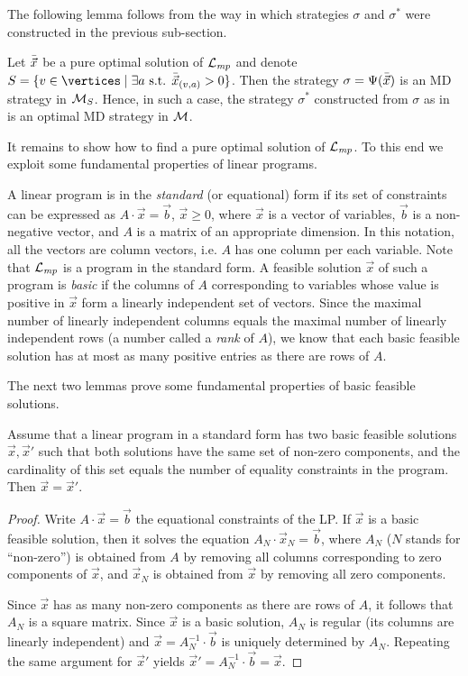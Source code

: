 \noindent
The following lemma follows from the way in which strategies $\sigma$ and $\sigma^*$ were constructed in the previous sub-section.

\begin{lemma}
	\label{5-lem:pure-lpsol}
Let $\bar{\vec{x}}$ be a pure optimal solution of $\mathcal{L}_{\mathit{mp}}$ and denote $ S = \{v \in \vertices\mid \exists a \text{ s.t. }\lpsol{x}_{(v,a)}>0\} $. Then the strategy $\sigma=\Psi(\bar{\vec{x}})$ is an MD strategy in $\mathcal{M}_{S}$. Hence, in such a case, the strategy $\sigma^*$ constructed from $ \sigma $ as in  is an optimal MD strategy in $\mathcal{M}$.
\end{lemma}

It remains to show how to find a pure optimal solution of $\mathcal{L}_{\mathit{mp}}$. To this end we exploit some fundamental properties of linear programs.

A linear program is in the \emph{standard} (or equational) form if its set of constraints can be expressed as $A\cdot \vec{x} = \vec{b}$, $\vec{x}\geq 0$, where $\vec{x}$ is a vector of variables, $\vec{b}$ is a non-negative vector, and $A$ is a matrix of an appropriate dimension. In this notation, all the vectors are column vectors, i.e. $A$ has one column per each variable. Note that $\mathcal{L}_{\mathit{mp}}$ is a program in the standard form. A feasible solution $\vec{x}$ of such a program is \emph{basic} if the columns of $A$ corresponding to variables whose value is positive in $\vec{x}$ form a linearly independent set of vectors. Since the maximal number of linearly independent columns equals the maximal number of linearly independent rows (a number called a \emph{rank} of $A$), we know that each basic feasible solution has at most as many positive entries as there are rows of $A$. 

The next two lemmas prove some fundamental properties of basic feasible solutions.

\begin{lemma}
\label{5-lem:basic-cond-unique}
Assume that a linear program in a standard form has two basic feasible solutions $\vec{x},\vec{x}'$ such that both solutions have the same set of non-zero components, and the cardinality of this set equals the number of equality constraints in the program. Then $\vec{x}=\vec{x}'$.
\end{lemma}
\begin{proof}
Write $A\cdot \vec{x} = \vec{b}$ the equational constraints of the LP.
If $\vec{x}$ is a basic feasible solution, then it solves the equation $A_{N} \cdot \vec{x}_N = \vec{b}$, where $A_N$ ($  N$ stands for ``non-zero'') is obtained from $A$ by removing all columns corresponding to zero components of $\vec{x}$, and   $\vec{x}_N$ is obtained from $\vec{x}$ by removing all zero components. 

Since $\vec{x}$ has as many non-zero components as there are rows of $A$, it follows that $A_N$ is a square matrix. Since $\vec{x}$ is a basic solution, $A_N$ is regular (its columns are linearly independent) and $\vec{x}=A_{N}^{-1}\cdot \vec{b}$ is uniquely determined by $A_N$. Repeating the same argument for $\vec{x}'$ yields $\vec{x}'=A_{N}^{-1}\cdot \vec{b}= \vec{x}$.
\end{proof}

